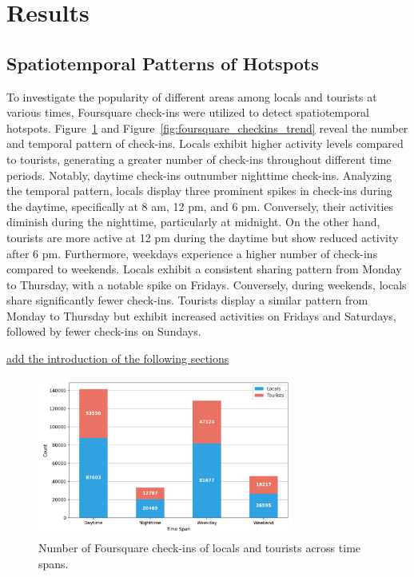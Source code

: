 \documentclass{article}
\theoremstyle{definition}
\theoremstyle{remark}
\begin{document}
\clearpage

\section{Results}

\subsection{Spatiotemporal Patterns of Hotspots}

To investigate the popularity of different areas among locals and tourists at various times, Foursquare check-ins were utilized to detect spatiotemporal hotspots. Figure~\ref{fig:foursquare_checkins_count} and Figure~\ref{fig:foursquare_checkins_trend} reveal the number and temporal pattern of check-ins. Locals exhibit higher activity levels compared to tourists, generating a greater number of check-ins throughout different time periods. Notably, daytime check-ins outnumber nighttime check-ins. Analyzing the temporal pattern, locals display three prominent spikes in check-ins during the daytime, specifically at 8 am, 12 pm, and 6 pm. Conversely, their activities diminish during the nighttime, particularly at midnight. On the other hand, tourists are more active at 12 pm during the daytime but show reduced activity after 6 pm. Furthermore, weekdays experience a higher number of check-ins compared to weekends. Locals exhibit a consistent sharing pattern from Monday to Thursday, with a notable spike on Fridays. Conversely, during weekends, locals share significantly fewer check-ins. Tourists display a similar pattern from Monday to Thursday but exhibit increased activities on Fridays and Saturdays, followed by fewer check-ins on Sundays.

\underline{add the introduction of the following sections}

\begin{figure}[!h]
\centering
\includegraphics[width=0.75\textwidth]{figures/foursquare_checkins_count.png}
\caption{\label{fig:foursquare_checkins_count}Number of Foursquare check-ins of locals and tourists across time spans.}
\end{figure}
\end{document}
